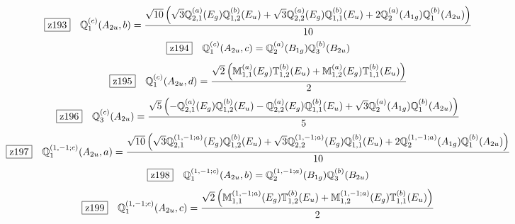 \documentclass[fleqn,10pt,landscape]{jsarticle}
\begin{document}
\begin{dmath*}
\hspace*{3mm}\fbox{z193}\quad \mathbb{Q}_{1}^{(c)}(A_{2u},b)=\frac{\sqrt{10} \left(\sqrt{3} \mathbb{Q}_{2,1}^{(a)}(E_{g}) \mathbb{Q}_{1,2}^{(b)}(E_{u}) + \sqrt{3} \mathbb{Q}_{2,2}^{(a)}(E_{g}) \mathbb{Q}_{1,1}^{(b)}(E_{u}) + 2 \mathbb{Q}_{2}^{(a)}(A_{1g}) \mathbb{Q}_{1}^{(b)}(A_{2u})\right)}{10}
\end{dmath*}
\begin{dmath*}
\hspace*{3mm}\fbox{z194}\quad \mathbb{Q}_{1}^{(c)}(A_{2u},c)=\mathbb{Q}_{2}^{(a)}(B_{1g}) \mathbb{Q}_{3}^{(b)}(B_{2u})
\end{dmath*}
\begin{dmath*}
\hspace*{3mm}\fbox{z195}\quad \mathbb{Q}_{1}^{(c)}(A_{2u},d)=\frac{\sqrt{2} \left(\mathbb{M}_{1,1}^{(a)}(E_{g}) \mathbb{T}_{1,2}^{(b)}(E_{u}) + \mathbb{M}_{1,2}^{(a)}(E_{g}) \mathbb{T}_{1,1}^{(b)}(E_{u})\right)}{2}
\end{dmath*}
\begin{dmath*}
\hspace*{3mm}\fbox{z196}\quad \mathbb{Q}_{3}^{(c)}(A_{2u})=\frac{\sqrt{5} \left(- \mathbb{Q}_{2,1}^{(a)}(E_{g}) \mathbb{Q}_{1,2}^{(b)}(E_{u}) - \mathbb{Q}_{2,2}^{(a)}(E_{g}) \mathbb{Q}_{1,1}^{(b)}(E_{u}) + \sqrt{3} \mathbb{Q}_{2}^{(a)}(A_{1g}) \mathbb{Q}_{1}^{(b)}(A_{2u})\right)}{5}
\end{dmath*}
\begin{dmath*}
\hspace*{3mm}\fbox{z197}\quad \mathbb{Q}_{1}^{(1,-1;c)}(A_{2u},a)=\frac{\sqrt{10} \left(\sqrt{3} \mathbb{Q}_{2,1}^{(1,-1;a)}(E_{g}) \mathbb{Q}_{1,2}^{(b)}(E_{u}) + \sqrt{3} \mathbb{Q}_{2,2}^{(1,-1;a)}(E_{g}) \mathbb{Q}_{1,1}^{(b)}(E_{u}) + 2 \mathbb{Q}_{2}^{(1,-1;a)}(A_{1g}) \mathbb{Q}_{1}^{(b)}(A_{2u})\right)}{10}
\end{dmath*}
\begin{dmath*}
\hspace*{3mm}\fbox{z198}\quad \mathbb{Q}_{1}^{(1,-1;c)}(A_{2u},b)=\mathbb{Q}_{2}^{(1,-1;a)}(B_{1g}) \mathbb{Q}_{3}^{(b)}(B_{2u})
\end{dmath*}
\begin{dmath*}
\hspace*{3mm}\fbox{z199}\quad \mathbb{Q}_{1}^{(1,-1;c)}(A_{2u},c)=\frac{\sqrt{2} \left(\mathbb{M}_{1,1}^{(1,-1;a)}(E_{g}) \mathbb{T}_{1,2}^{(b)}(E_{u}) + \mathbb{M}_{1,2}^{(1,-1;a)}(E_{g}) \mathbb{T}_{1,1}^{(b)}(E_{u})\right)}{2}
\end{dmath*}
\end{document}
